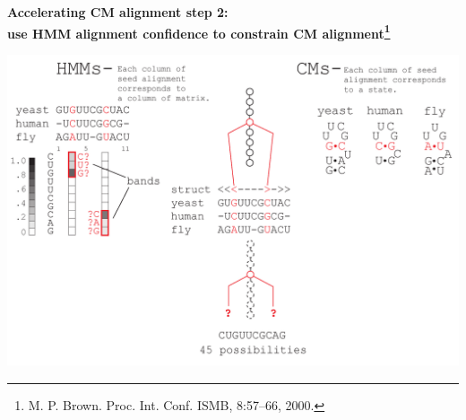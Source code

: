 \documentclass[landscape]{slides}
\begin{document}
\begin{slide}
\begin{slide}
\begin{center}
\textbf{Accelerating CM alignment step 2: \\ use HMM alignment
  confidence to constrain CM alignment\footnote{M. P. Brown. Proc. Int. Conf. ISMB, 8:57–66, 2000.}}
\end{center}
\medskip
\small
\begin{center}
\includegraphics[width=8in]{figs/post_hmm_to_cm_map2_layer15}
\end{center}
\vfill
\end{slide}
\begin{slide}
\begin{center}


\end{center}
\end{slide}
\end{slide}
\end{document}
